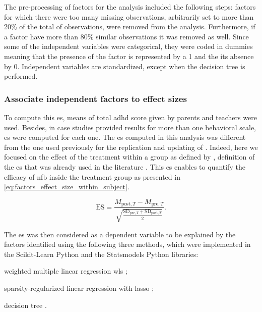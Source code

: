 The pre-processing of factors for the analysis included the following steps: factors for which there were too many missing observations, 
arbitrarily set to more than 20\% of the total of observations, were removed from the analysis. Furthermore, if a factor have more than 
80\% similar observations it was removed as well. Since some of the independent variables were categorical, they were coded in dummies
meaning that the presence of the factor is represented by a 1 and the its absence by 0. Independent variables are standardized, 
except when the decision tree is performed. 

\subsubsection{Associate independent factors to effect sizes}

To compute this \gls{es}, means of total \gls{adhd} score given by parents and teachers were used. Besides, in case studies provided results 
for more than one behavioral scale, \gls{es} were computed for each one. The \gls{es} computed in this analysis was different from the one 
used previously for the replication and updating of \citet{Cortese2016}. Indeed, here we focused on the effect of the treatment within 
a group as defined by \citet{Cohen1988}, definition of the \gls{es} that was already used in the literature \citep{Arns2009, Maurizio2014, 
Strehl2017}. This \gls{es} enables to quantify the efficacy of \gls{nfb} inside the treatment group as presented in \cref{eq:factors_effect_size_within_subject}.

\begin{equation}
\label{eq:factors_effect_size_within_subject}
\text{ES} = \frac{M_{\text{post},T} - M_{\text{pre},T}}  { \sqrt{ \frac{\text{SD}_{\text{pre},T} + \text{SD}_{\text{post},T}} {2} } }.
\end{equation} 

The \gls{es} was then considered as a dependent variable to be explained by the factors identified using the following three methods, which were 
implemented in the Scikit-Learn Python \citep{Pedregosa2011} and the Statsmodels Python\citep{Seabold2010} libraries:
\begin{description}
	\item weighted multiple linear regression \gls{wls} \citep{Montgomery2012}; 
	\item sparsity-regularized linear regression with \gls{lasso} \citep{Tibshirani1996};
	\item decision tree \citep{Quinlan1986}.
\end{description}

